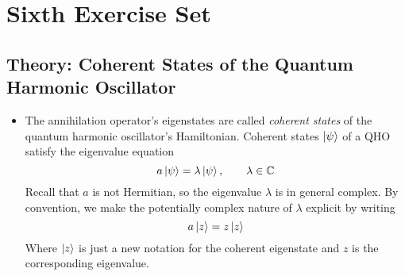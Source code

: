 \documentclass[11pt, a4paper]{article}
\begin{document}
\section{Sixth Exercise Set}

\subsection{Theory: Coherent States of the Quantum Harmonic Oscillator}
\begin{itemize}
	\item The annihilation operator's eigenstates are called \textit{coherent states} of the quantum harmonic oscillator's Hamiltonian. Coherent states  $ \ket{\psi} $ of a QHO satisfy the eigenvalue equation
	\begin{equation*}
		a \ket{\psi} = \lambda \ket{\psi}, \qquad \lambda \in \mathbb{C}
	\end{equation*}
	Recall that $ a $ is not Hermitian, so the eigenvalue $ \lambda $ is in general complex. By convention, we make the potentially complex nature of $ \lambda $ explicit by writing 
	\begin{equation*}
		a \ket{z} = z \ket{z}
	\end{equation*}
	Where $ \ket{z} $ is just a new notation for the coherent eigenstate and $ z $ is the corresponding eigenvalue.
	

\end{itemize}
\end{document}
